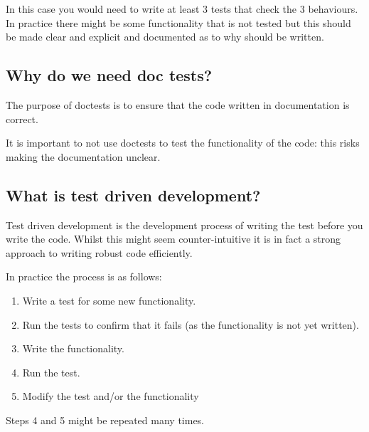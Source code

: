 In this case you would need to write at least 3 tests that check the 3
behaviours.
In practice there might be some functionality that is not tested but this should
be made clear and explicit and documented as to why should be written.


\subsection{Why do we need doc tests?}
\label{\detokenize{building-tools/07-testing/why/main:why-do-we-need-doc-tests}}

The purpose of doctests is to ensure that the code written in documentation is
correct.

It is important to not use doctests to test the functionality of the code: this
risks making the documentation unclear.


\subsection{What is test driven development?}
\label{\detokenize{building-tools/07-testing/why/main:what-is-test-driven-development}}

Test driven development is the development process of writing the test before
you write the code. Whilst this might seem counter-intuitive it is in fact a
strong approach to writing robust code efficiently.


In practice the process is as follows:
\begin{enumerate}

\item 

Write a test for some new functionality.

\item 

Run the tests to confirm that it fails (as the functionality is not yet
written).

\item 

Write the functionality.

\item 

Run the test.

\item 

Modify the test and/or the functionality

\end{enumerate}


Steps 4 and 5 might be repeated many times.


